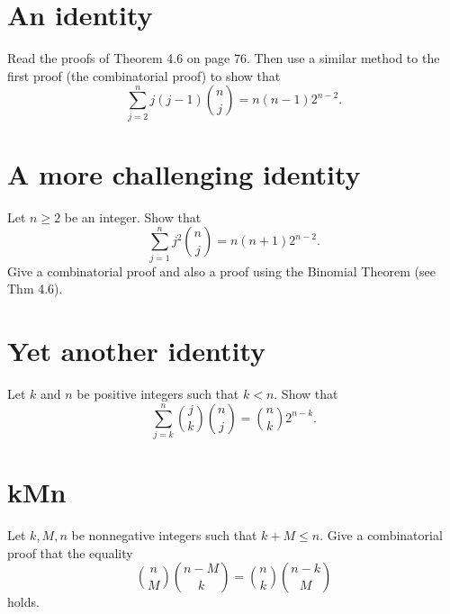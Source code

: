\documentclass[11pt]{amsart}
\begin{document}
\section{An identity}\label{sec:identity_thm4.6}
Read the proofs of Theorem 4.6 on page 76. Then use a similar method to the first proof (the combinatorial proof) to show that 
\[
\displaystyle \sum_{j=2}^n j(j-1) {n \choose j} = n (n-1) 2^{n-2}. 
\]



\section{A more challenging identity}\label{sec:identity}

Let $n \geq 2$ be an integer.
Show that 
\[
\sum_{j=1}^n j^2 {n \choose j} = n (n+1) 2^{n-2}.
\]
Give a combinatorial proof and also a proof using the Binomial Theorem (see Thm 4.6). 



\section{Yet another identity}
Let $k$ and $n$ be positive integers such that $k < n$. 
Show that 
\[
\sum_{j=k}^n {j \choose k } {n \choose j} =  {n \choose k} 2^{n-k}.
\]





\section{kMn}\label{sec:kMn}
Let $k, M, n$ be nonnegative integers such that $k+M \leq n$.
Give a combinatorial proof that  the equality 
\[
{n \choose M}  {n-M \choose k} = 
{n \choose k}  {n-k \choose M} 
\]
holds.





\end{document}
